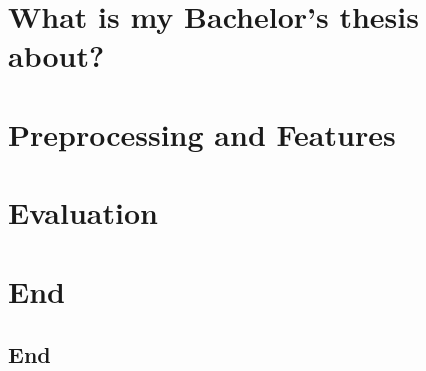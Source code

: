 \documentclass[hyperref={pdfpagelabels=false},usepdftitle=false]{beamer}
\begin{document}

\title{\titleText}
\subtitle{Bachelor's thesis of Martin Thoma}
\author{\tutor}
\date{5th of June, 2014}

\frame{\titlepage}



\section{What is my Bachelor's thesis about?}


\section{Preprocessing and Features}



\section{Evaluation}


\section*{End}
\subsection{End}

\end{document}
